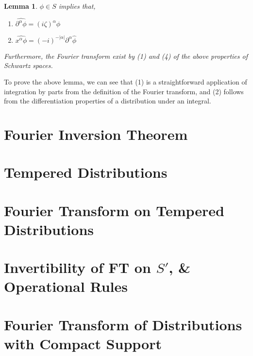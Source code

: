 \documentclass[12pt, a4]{article}
\newtheorem{lemma}[theorem]{Lemma}
\begin{document}
\begin{lemma}
    $\phi \in S$ implies that,

    \begin{enumerate}
        \item $\widehat{\partial^\alpha\phi} = (i \zeta)^\alpha \hat{\phi}$
        \item $\widehat{x^\alpha\phi} = (-i)^{-|\alpha|}\partial^\alpha \hat{\phi}$
    \end{enumerate}

    Furthermore, the Fourier transform exist by (1) and (4) of the above properties of Schwartz spaces.
\end{lemma}

To prove the above lemma, we can see that (1) is a straightforward application of integration by parts from the definition of the Fourier transform, and (2) follows from the differentiation properties of a distribution under an integral.

\section{Fourier Inversion Theorem}

\section{Tempered Distributions}

\section{Fourier Transform on Tempered Distributions}

\section{Invertibility of FT on $S'$, \& Operational Rules}


\section{Fourier Transform of Distributions with Compact Support}
\end{document}
